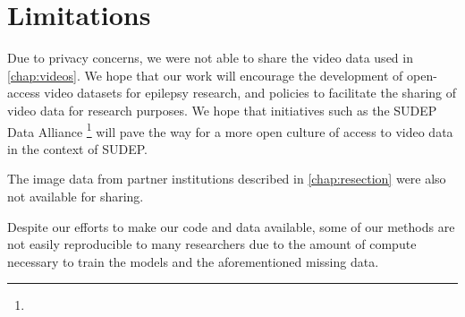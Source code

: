 \section{Limitations}

Due to privacy concerns, we were not able to share the video data used in \cref{chap:videos}.
We hope that our work will encourage the development of open-access video datasets for epilepsy research, and policies to facilitate the sharing of video data for research purposes.
We hope that initiatives such as the \acs{SUDEP} Data Alliance%
\footnote{}
will pave the way for a more open culture of access to video data in the context of \acs{SUDEP}.

The image data from partner institutions described in \cref{chap:resection} were also not available for sharing.

Despite our efforts to make our code and data available, some of our methods are not easily reproducible to many researchers due to the amount of compute necessary to train the models and the aforementioned missing data.
